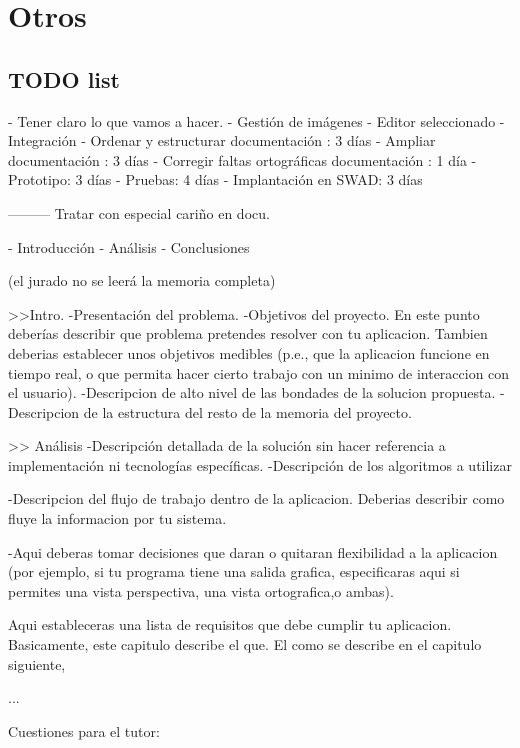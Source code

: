 \chapter{Otros}


\section{TODO list}

- Tener claro lo que vamos a hacer.
    - Gestión de imágenes
    - Editor seleccionado
    - Integración
- Ordenar y estructurar documentación : 3 días 
- Ampliar documentación : 3 días
- Corregir faltas ortográficas documentación : 1 día
- Prototipo: 3 días
- Pruebas: 4 días
- Implantación en SWAD: 3 días




---------
Tratar con especial cariño en docu.

- Introducción
- Análisis
- Conclusiones

(el jurado no se leerá la memoria completa)

>>Intro.
-Presentación del problema.
-Objetivos del proyecto. En este punto deberías describir que problema
pretendes resolver con tu aplicacion. Tambien deberias establecer unos objetivos medibles (p.e., que la aplicacion funcione en tiempo real, o que permita hacer cierto trabajo con un minimo de interaccion con el usuario).
-Descripcion de alto nivel de las bondades de la solucion propuesta.
-Descripcion de la estructura del resto de la memoria del proyecto.


>> Análisis
-Descripción detallada de la solución sin hacer referencia a implementación ni tecnologías específicas.
-Descripción de los algoritmos a utilizar

-Descripcion del flujo de trabajo dentro de la aplicacion. Deberias describir como fluye la informacion por tu sistema.

-Aqui deberas tomar decisiones que daran o quitaran flexibilidad a la aplicacion (por ejemplo, si tu programa tiene una salida grafica, especificaras aqui si permites una vista perspectiva, una vista ortografica,o ambas).

Aqui estableceras una lista de requisitos que debe cumplir tu aplicacion. Basicamente, este capitulo describe el que. El como se describe en el capitulo siguiente,



...




Cuestiones para el tutor:



